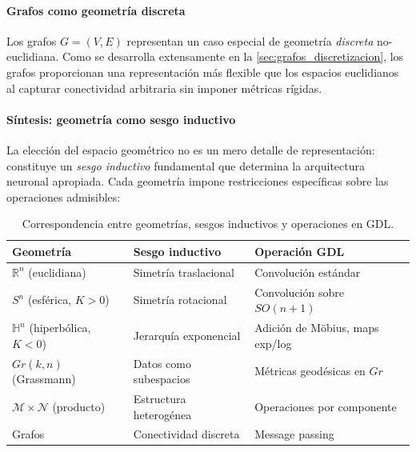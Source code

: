 \paragraph{Grafos como geometría discreta}

Los grafos $G = (V, E)$ representan un caso especial de geometría \textit{discreta} no-euclidiana. Como se desarrolla extensamente en la \autoref{sec:grafos_discretizacion}, los grafos proporcionan una representación más flexible que los espacios euclidianos al capturar conectividad arbitraria sin imponer métricas rígidas.

\paragraph{Síntesis: geometría como sesgo inductivo}

La elección del espacio geométrico no es un mero detalle de representación: constituye un \textit{sesgo inductivo} fundamental que determina la arquitectura neuronal apropiada. Cada geometría impone restricciones específicas sobre las operaciones admisibles:

\begin{table}[htbp]
\centering
\small
\caption{Correspondencia entre geometrías, sesgos inductivos y operaciones en GDL.}
\label{tab:geometria_sesgo_operacion}
\begin{tabular}{@{}lll@{}}
    \toprule
    \textbf{Geometría} & \textbf{Sesgo inductivo} & \textbf{Operación GDL} \\
    \midrule
    $\mathbb{R}^n$ (euclidiana) & Simetría traslacional & Convolución estándar \\
    $S^n$ (esférica, $K>0$) & Simetría rotacional & Convolución sobre $SO(n{+}1)$ \\
    $\mathbb{H}^n$ (hiperbólica, $K<0$) & Jerarquía exponencial & Adición de Möbius, maps exp/log \\
    $Gr(k,n)$ (Grassmann) & Datos como subespacios & Métricas geodésicas en $Gr$ \\
    $\mathcal{M} \times \mathcal{N}$ (producto) & Estructura heterogénea & Operaciones por componente \\
    Grafos & Conectividad discreta & Message passing \\
    \bottomrule
\end{tabular}
\end{table}


